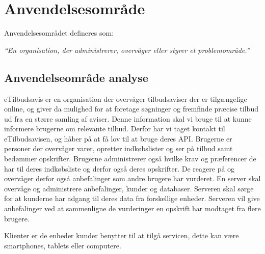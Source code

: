 \chapter{Anvendelsesområde}
Anvendelsesområdet defineres som:

\textit{``En organisation, der administrerer, overvåger eller styrer et problemområde.''}

\section{Anvendelseområde analyse}
eTilbudsavis er en organisation der overvåger tilbudsaviser der er tilgængelige online, og giver da mulighed for at foretage søgninger og fremfinde præcise tilbud ud fra en større samling af aviser.
Denne information skal vi bruge til at kunne informere brugerne om relevante tilbud.
Derfor har vi taget kontakt til eTilbudsavisen, og håber på at få lov til at bruge deres API.
Brugerne er personer der overvåger varer, opretter indkøbslister og ser på tilbud samt bedømmer opskrifter.
Brugerne administrerer også hvilke krav og præferencer de har til deres indkøbsliste og derfor også deres opskrifter.
De reagere på og overvåger derfor også anbefalinger som andre brugere har vurderet.
En server skal overvåge og administrere anbefalinger, kunder og databaser.
Serveren skal sørge  for at kunderne har adgang til deres data fra forskellige enheder.
Serveren vil give anbefalinger ved at sammenligne de vurderinger en opskrift har modtaget fra flere brugere.

Klienter er de enheder kunder benytter til at tilgå servicen, dette kan være smartphones, tablets eller computere.


